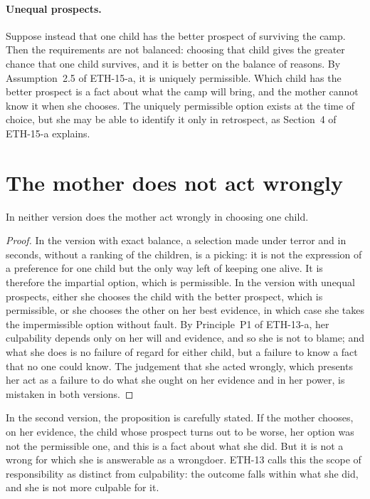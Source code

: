 \documentclass{situationist-preprint}
\begin{document}
\paragraph{Unequal prospects.} Suppose instead that one child has the better prospect of surviving the camp. Then the requirements are not balanced: choosing that child gives the greater chance that one child survives, and it is better on the balance of reasons. By Assumption~2.5 of ETH-15-a, it is uniquely permissible. Which child has the better prospect is a fact about what the camp will bring, and the mother cannot know it when she chooses. The uniquely permissible option exists at the time of choice, but she may be able to identify it only in retrospect, as Section~4 of ETH-15-a explains.

\section{The mother does not act wrongly}

\begin{proposition}\label{p:notwrong}
In neither version does the mother act wrongly in choosing one child.
\end{proposition}

\begin{proof}
In the version with exact balance, a selection made under terror and in seconds, without a ranking of the children, is a picking: it is not the expression of a preference for one child but the only way left of keeping one alive. It is therefore the impartial option, which is permissible. In the version with unequal prospects, either she chooses the child with the better prospect, which is permissible, or she chooses the other on her best evidence, in which case she takes the impermissible option without fault. By Principle~P1 of ETH-13-a, her culpability depends only on her will and evidence, and so she is not to blame; and what she does is no failure of regard for either child, but a failure to know a fact that no one could know. The judgement that she acted wrongly, which presents her act as a failure to do what she ought on her evidence and in her power, is mistaken in both versions.
\end{proof}

In the second version, the proposition is carefully stated. If the mother chooses, on her evidence, the child whose prospect turns out to be worse, her option was not the permissible one, and this is a fact about what she did. But it is not a wrong for which she is answerable as a wrongdoer. ETH-13 calls this the scope of responsibility as distinct from culpability: the outcome falls within what she did, and she is not more culpable for it.
\end{document}
